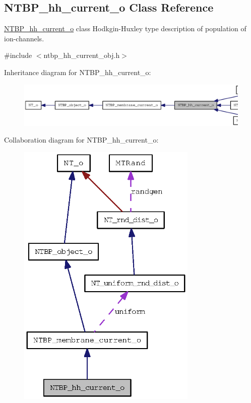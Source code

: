\subsection{NTBP\_\-hh\_\-current\_\-o Class Reference}
\label{class_n_t_b_p__hh__current__o}


\hyperlink{class_n_t_b_p__hh__current__o}{NTBP\_\-hh\_\-current\_\-o} class Hodkgin-\/Huxley type description of population of ion-\/channels.  




{\ttfamily \#include $<$ntbp\_\-hh\_\-current\_\-obj.h$>$}



Inheritance diagram for NTBP\_\-hh\_\-current\_\-o:
\nopagebreak
\begin{figure}[H]
\begin{center}
\leavevmode
\includegraphics[width=400pt]{class_n_t_b_p__hh__current__o__inherit__graph}
\end{center}
\end{figure}


Collaboration diagram for NTBP\_\-hh\_\-current\_\-o:
\nopagebreak
\begin{figure}[H]
\begin{center}
\leavevmode
\includegraphics[width=243pt]{class_n_t_b_p__hh__current__o__coll__graph}
\end{center}
\end{figure}
